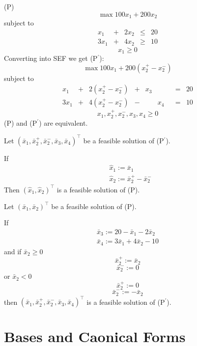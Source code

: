 \begin{exbox}
    \begin{example}
        (P)
        \[\max 100x_1+200x_2\]
        subject to
        \[
            \begin{array}{ccccc}
                x_1  & + & 2x_2 & \leqslant & 20 \\
                3x_1 & + & 4x_2 & \geqslant & 10
            \end{array}
        \]
        \[x_1 \geqslant  0\]
        Converting into SEF we get (P$^\prime$):
        \[\max 100x_1+200(x_2^+-x_2^-)\]
        subject to
        \[
            \begin{array}{ccccccccc}
                x_1  & + & 2(x_2^+-x_2^-) & + & x_3 &     &  & = & 20 \\
                3x_1 & + & 4(x_2^+-x_2^-) & - &     & x_4 &  & = & 10
            \end{array}
        \]
        \[x_1,x_2^+,x_2^-,x_3,x_4\geqslant  0\]
        (P) and (P$^\prime$) are equivalent.

        Let
        $(\bar{x}_1, \bar{x}_2^+, \bar{x}_2^-, \bar{x}_3, \bar{x}_4)^\top$
        be a feasible solution of (P$^\prime$).


        If
        \begin{align*}
             & \hat{x}_1:=\bar{x}_1               \\
             & \hat{x}_2:=\bar{x}_2^+-\bar{x}_2^-
        \end{align*}
        Then
        $(\hat{x}_1,\hat{x}_2)^\top$
        is a feasible solution of (P).

        Let
        $(\bar{x}_1, \bar{x}_2)^\top$
        be a feasible solution of (P).

        If
        \begin{align*}
            \bar{x}_3:=20-\bar{x}_1-2\bar{x}_2 \\
            \bar{x}_4:=3\bar{x}_1+4\bar{x}_2-10
        \end{align*}
        and
        if $\bar{x}_2\geqslant  0$
        \[\bar{x}_2^+:=\bar{x}_2\]
        \[\bar{x}_2^-:=0\]
        or $\bar{x}_2< 0$
        \[\bar{x}_2^+:=0\]
        \[\bar{x}_2^-:=-\bar{x}_2\]
        then $(\bar{x}_1,\bar{x}_2^+,\bar{x}_2^-,\bar{x}_3,\bar{x}_4)^\top$
        is a feasible solution of (P$^\prime$).
    \end{example}
\end{exbox}

\section{Bases and Caonical Forms}
